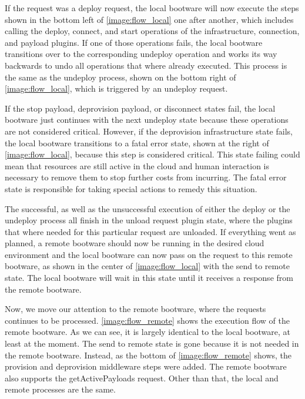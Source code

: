 If the request was a deploy request, the local bootware will now execute the steps shown in the bottom left of \autoref{image:flow_local} one after another, which includes calling the deploy, connect, and start operations of the infrastructure, connection, and payload plugins.
If one of those operations fails, the local bootware transitions over to the corresponding undeploy operation and works its way backwards to undo all operations that where already executed.
This process is the same as the undeploy process, shown on the bottom right of \autoref{image:flow_local}, which is triggered by an undeploy request.

If the stop payload, deprovision payload, or disconnect states fail, the local bootware just continues with the next undeploy state because these operations are not considered critical.
However, if the deprovision infrastructure state fails, the local bootware transitions to a fatal error state, shown at the right of \autoref{image:flow_local}, because this step is considered critical.
This state failing could mean that resources are still active in the cloud and human interaction is necessary to remove them to stop further costs from incurring.
The fatal error state is responsible for taking special actions to remedy this situation.

The successful, as well as the unsuccessful execution of either the deploy or the undeploy process all finish in the unload request plugin state, where the plugins that where needed for this particular request are unloaded.
If everything went as planned, a remote bootware should now be running in the desired cloud environment and the local bootware can now pass on the request to this remote bootware, as shown in the center of \autoref{image:flow_local} with the send to remote state.
The local bootware will wait in this state until it receives a response from the remote bootware.

Now, we move our attention to the remote bootware, where the requests continues to be processed.
\autoref{image:flow_remote} shows the execution flow of the remote bootware.
As we can see, it is largely identical to the local bootware, at least at the moment.
The send to remote state is gone because it is not needed in the remote bootware.
Instead, as the bottom of \autoref{image:flow_remote} shows, the provision and deprovision middleware steps were added.
The remote bootware also supports the getActivePayloads request.
Other than that, the local and remote processes are the same.

